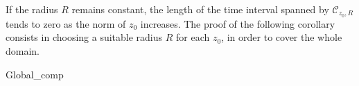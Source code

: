 		If the radius $ R $ remains constant, the length of the time interval spanned by $ \mathcal{C}_{z_0, R} $ tends to zero as the norm of $ z_0 $ increases. The proof of the following corollary consists in choosing a suitable radius $ R $ for each $ z_0 $, in order to cover the whole domain.
		
		{Global_comp}
		